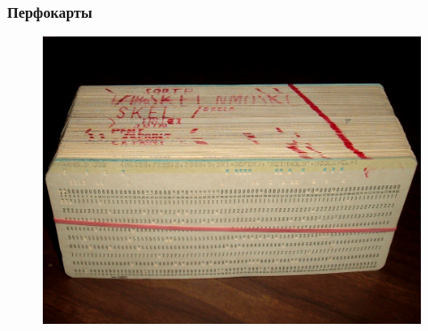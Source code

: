 \documentclass[t,aspectratio=169]{beamer}
\begin{document}
\begin{frame}
    \frametitle{Перфокарты}
    \begin{figure}
        \begin{centering}
            \includegraphics[height=0.7\textheight]{punched-cards}
        \end{centering}
    \end{figure}
\end{frame}
\end{document}
